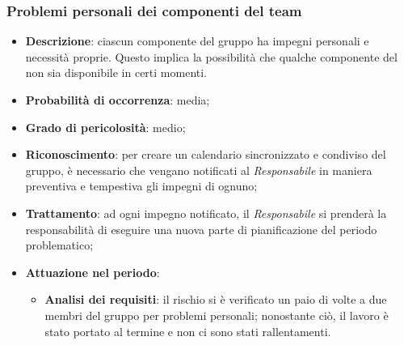 		\subsubsection{Problemi personali dei componenti del team}
		\begin{itemize}
			\item \textbf{Descrizione}: ciascun componente del gruppo ha impegni personali e necessità proprie. Questo implica la possibilità che qualche componente del  non sia disponibile in certi momenti.
			\item \textbf{Probabilità di occorrenza}: media;
			\item \textbf{Grado di pericolosità}: medio;
			\item \textbf{Riconoscimento}: per creare un calendario sincronizzato e condiviso del gruppo, è necessario che vengano notificati al \emph{Responsabile} in maniera preventiva e tempestiva gli impegni di ognuno;
			\item \textbf{Trattamento}: ad ogni impegno notificato, il \emph{Responsabile} si prenderà la responsabilità di eseguire una nuova parte di pianificazione del periodo problematico; 
			\item \textbf{Attuazione nel periodo}:
			\begin{itemize}
				\item \textbf{Analisi dei requisiti}: il rischio si è verificato un paio di volte a due membri del gruppo per problemi personali; nonostante ciò, il lavoro è stato portato al termine e non ci sono stati rallentamenti.
			\end{itemize}
		\end{itemize}
